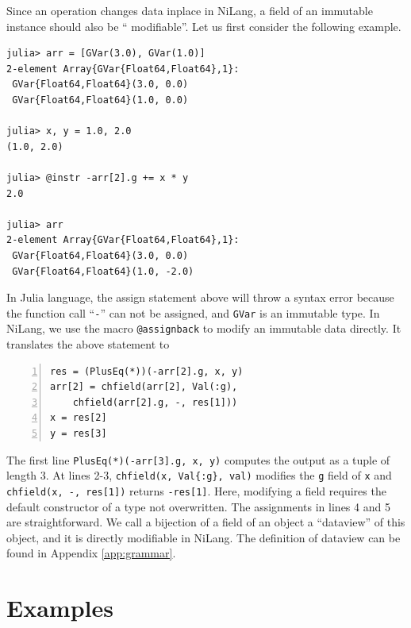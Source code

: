 \documentclass{article}
\newcommand{\<}{\langle}
\renewcommand{\>}{\rangle}
\newcommand{\App}[1]{Appendix \ref{#1}}
\theoremstyle{definition}\newtheorem{definition}{\textit{Definition}}
\begin{document}
Since an operation changes data inplace in NiLang, a field of an immutable instance should also be `` modifiable''.
Let us first consider the following example.

\begin{minipage}{.88\columnwidth}
\begin{lstlisting}
julia> arr = [GVar(3.0), GVar(1.0)]
2-element Array{GVar{Float64,Float64},1}:
 GVar{Float64,Float64}(3.0, 0.0)
 GVar{Float64,Float64}(1.0, 0.0)

julia> x, y = 1.0, 2.0
(1.0, 2.0)

julia> @instr -arr[2].g += x * y
2.0

julia> arr
2-element Array{GVar{Float64,Float64},1}:
 GVar{Float64,Float64}(3.0, 0.0) 
 GVar{Float64,Float64}(1.0, -2.0)
\end{lstlisting}
\end{minipage}

In Julia language, the assign statement above will throw a syntax error because the function call ``\texttt{-}'' can not be assigned, and \texttt{GVar} is an immutable type.
In NiLang, we use the macro \texttt{@assignback} to modify an immutable data directly. It translates the above statement to

\begin{minipage}{.88\columnwidth}
\begin{lstlisting}[numberstyle=\scriptsize\color{gray},numbers=left,numbersep=8pt]
res = (PlusEq(*))(-arr[2].g, x, y)
arr[2] = chfield(arr[2], Val(:g),
    chfield(arr[2].g, -, res[1]))
x = res[2]
y = res[3]
\end{lstlisting}
\end{minipage}

The first line \texttt{PlusEq(*)(-arr[3].g, x, y)} computes the output as a tuple of length $3$.
At lines 2-3, \texttt{chfield(x, Val\{:g\}, val)} modifies the \texttt{g} field of \texttt{x} and \texttt{chfield(x, -, res[1])} returns \texttt{-res[1]}. Here, modifying a field requires the default constructor of a type not overwritten.
The assignments in lines 4 and 5 are straightforward.
We call a bijection of a field of an object a ``dataview'' of this object, and it is directly modifiable in NiLang.
The definition of dataview can be found in \App{app:grammar}.

\section{Examples}\label{sec:example}
\end{document}
